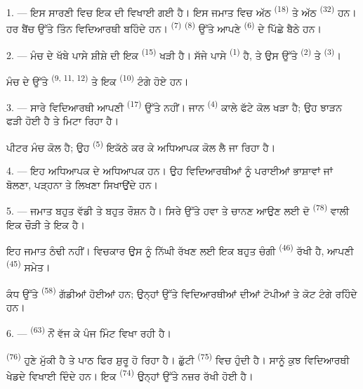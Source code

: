 \VUsaut{3.0mm}

1. --- ਇਸ ਸਾਰਣੀ ਵਿਚ ਇਕ  ਦੀ  ਵਿਖਾਈ ਗਈ ਹੈ। ਇਸ ਜਮਾਤ
ਵਿਚ ਅੱਠ  \textsuperscript{(18)} ਤੇ ਅੱਠ 
\textsuperscript{(32)} ਹਨ। ਹਰ ਬੈਂਚ ਉੱਤੇ ਤਿੰਨ ਵਿਦਿਆਰਥੀ ਬਹਿੰਦੇ ਹਨ।
 \textsuperscript{(7)}  \textsuperscript{(8)} ਉੱਤੇ
ਆਪਣੇ  \textsuperscript{(6)} ਦੇ ਪਿੱਛੇ ਬੈਠੇ ਹਨ।

2. --- ਮੰਚ ਦੇ ਖੱਬੇ ਪਾਸੇ ਸ਼ੀਸ਼ੇ ਦੀ ਇਕ  \textsuperscript{(15)} ਖੜੀ
ਹੈ। ਸੱਜੇ ਪਾਸੇ  \textsuperscript{(1)} ਹੈ, ਤੇ ਉਸ ਉੱਤੇ
 \textsuperscript{(2)} ਤੇ  \textsuperscript{(3)}।

ਮੰਚ ਦੇ ਉੱਤੇ  \textsuperscript{(9, 11, 12)} ਤੇ ਇਕ
 \textsuperscript{(10)} ਟੰਗੇ ਹੋਏ ਹਨ।

3. --- ਸਾਰੇ ਵਿਦਿਆਰਥੀ ਆਪਣੀ  \textsuperscript{(17)} ਉੱਤੇ ਨਹੀਂ। ਜਾਨ
\textsuperscript{(4)} ਕਾਲੇ ਫੱਟੇ ਕੋਲ ਖੜਾ ਹੈ; ਉਹ ਝਾੜਨ ਫੜੀ ਹੋਈ ਹੈ ਤੇ
 ਮਿਟਾ ਰਿਹਾ ਹੈ।

ਪੀਟਰ ਮੰਚ ਕੋਲ ਹੈ; ਉਹ  \textsuperscript{(5)} ਇਕੱਠੇ ਕਰ ਕੇ
ਅਧਿਆਪਕ ਕੋਲ ਲੈ ਜਾ ਰਿਹਾ ਹੈ।

4. --- ਇਹ ਅਧਿਆਪਕ  ਦੇ ਅਧਿਆਪਕ ਹਨ। ਉਹ ਵਿਦਿਆਰਥੀਆਂ ਨੂੰ
ਪਰਾਈਆਂ ਭਾਸ਼ਾਵਾਂ  ਜਾਂ
 ਬੋਲਣਾ, ਪੜ੍ਹਨਾ ਤੇ ਲਿਖਣਾ ਸਿਖਾਉਂਦੇ ਹਨ।

5. --- ਜਮਾਤ ਬਹੁਤ ਵੱਡੀ ਤੇ ਬਹੁਤ ਰੌਸ਼ਨ ਹੈ। ਸਿਰੇ ਉੱਤੇ ਹਵਾ ਤੇ ਚਾਨਣ ਆਉਣ ਲਈ ਦੋ
 \textsuperscript{(78)} ਵਾਲੀ ਇਕ ਚੌੜੀ  ਤੇ ਇਕ
 ਹੈ।

ਇਹ ਜਮਾਤ ਠੰਢੀ ਨਹੀਂ। ਵਿਚਕਾਰ ਉਸ ਨੂੰ ਨਿੱਘੀ ਰੱਖਣ ਲਈ ਇਕ ਬਹੁਤ ਚੰਗੀ
 \textsuperscript{(46)} ਰੱਖੀ ਹੈ, ਆਪਣੀ 
\textsuperscript{(45)} ਸਮੇਤ।

ਕੰਧ ਉੱਤੇ  \textsuperscript{(58)} ਗੱਡੀਆਂ ਹੋਈਆਂ ਹਨ; ਉਨ੍ਹਾਂ ਉੱਤੇ
ਵਿਦਿਆਰਥੀਆਂ ਦੀਆਂ ਟੋਪੀਆਂ ਤੇ ਕੋਟ ਟੰਗੇ ਰਹਿੰਦੇ ਹਨ।

\VUsaut{5.2mm}
\VUsaut{3.6mm}

6. ---  \textsuperscript{(63)} ਨੌਂ ਵੱਜ ਕੇ ਪੰਜ ਮਿੰਟ ਵਿਖਾ ਰਹੀ ਹੈ।

 \textsuperscript{(76)} ਹੁਣੇ ਮੁੱਕੀ ਹੈ ਤੇ ਪਾਠ ਫਿਰ ਸ਼ੁਰੂ ਹੋ ਰਿਹਾ
ਹੈ। ਛੁੱਟੀ  \textsuperscript{(75)} ਵਿਚ ਹੁੰਦੀ ਹੈ। ਸਾਨੂੰ ਕੁਝ
ਵਿਦਿਆਰਥੀ ਖੇਡਦੇ ਵਿਖਾਈ ਦਿੰਦੇ ਹਨ। ਇਕ  \textsuperscript{(74)}
ਉਨ੍ਹਾਂ ਉੱਤੇ ਨਜ਼ਰ ਰੱਖੀ ਹੋਈ ਹੈ।

